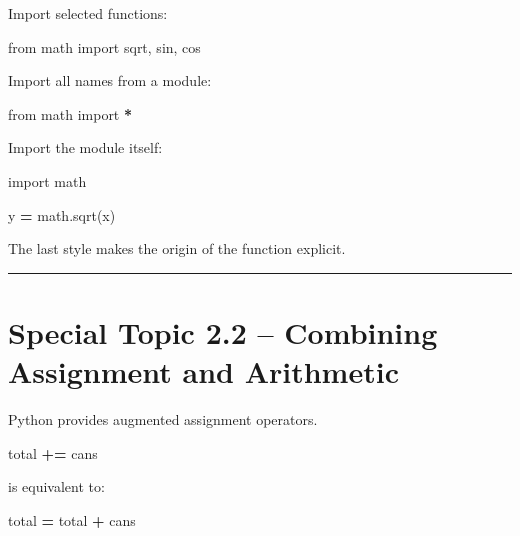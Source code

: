 \documentclass[
]{article}
\newenvironment{Shaded}{\begin{snugshade}}{\end{snugshade}}
\newcommand{\ImportTok}[1]{#1}
\newcommand{\NormalTok}[1]{#1}
\newcommand{\OperatorTok}[1]{\textcolor[rgb]{0.81,0.36,0.00}{\textbf{#1}}}
\begin{document}
Import selected functions:

\begin{Shaded}
\begin{Highlighting}[]
\ImportTok{from}\NormalTok{ math }\ImportTok{import}\NormalTok{ sqrt, sin, cos}
\end{Highlighting}
\end{Shaded}

Import all names from a module:

\begin{Shaded}
\begin{Highlighting}[]
\ImportTok{from}\NormalTok{ math }\ImportTok{import} \OperatorTok{*}
\end{Highlighting}
\end{Shaded}

Import the module itself:

\begin{Shaded}
\begin{Highlighting}[]
\ImportTok{import}\NormalTok{ math}

\NormalTok{y }\OperatorTok{=}\NormalTok{ math.sqrt(x)}
\end{Highlighting}
\end{Shaded}

The last style makes the origin of the function explicit.

\begin{center}\rule{0.5\linewidth}{0.5pt}\end{center}

\section{Special Topic 2.2 -- Combining Assignment and
Arithmetic}\label{special-topic-2.2-combining-assignment-and-arithmetic}

Python provides augmented assignment operators.

\begin{Shaded}
\begin{Highlighting}[]
\NormalTok{total }\OperatorTok{+=}\NormalTok{ cans}
\end{Highlighting}
\end{Shaded}

is equivalent to:

\begin{Shaded}
\begin{Highlighting}[]
\NormalTok{total }\OperatorTok{=}\NormalTok{ total }\OperatorTok{+}\NormalTok{ cans}
\end{Highlighting}
\end{Shaded}
\end{document}
